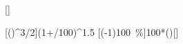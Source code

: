 [\percent]

[\left(\right)^{3/2}]{(1+\pgaX/100)^1.5}
[\left(-1\right)\cdot\SI{100}{\percent}]{100*()}[\percent]
